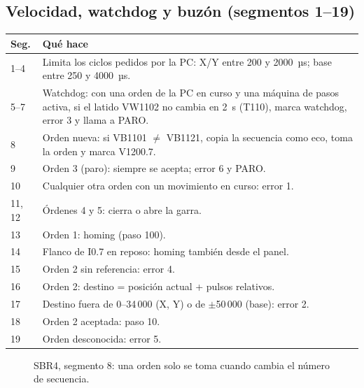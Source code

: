 \subsection{Velocidad, watchdog y buzón (segmentos 1--19)}
\begin{center}\small
\begin{longtable}{>{\raggedright}p{1.4cm} >{\raggedright\arraybackslash}p{13.6cm}}
\toprule
\textbf{Seg.} & \textbf{Qué hace}\\
\midrule
\endhead
1--4 & Limita los ciclos pedidos por la PC: X/Y entre 200 y 2000~µs; base entre 250 y 4000~µs.\\
5--7 & Watchdog: con una orden de la PC en curso y una máquina de pasos activa, si el latido VW1102 no cambia en 2~s (T110), marca watchdog, error 3 y llama a PARO.\\
8 & Orden nueva: si VB1101 $\neq$ VB1121, copia la secuencia como eco, toma la orden y marca V1200.7.\\
9 & Orden 3 (paro): siempre se acepta; error 6 y PARO.\\
10 & Cualquier otra orden con un movimiento en curso: error 1.\\
11, 12 & Órdenes 4 y 5: cierra o abre la garra.\\
13 & Orden 1: homing (paso 100).\\
14 & Flanco de I0.7 en reposo: homing también desde el panel.\\
15 & Orden 2 sin referencia: error 4.\\
16 & Orden 2: destino = posición actual + pulsos relativos.\\
17 & Destino fuera de 0--34\,000 (X, Y) o de $\pm$50\,000 (base): error 2.\\
18 & Orden 2 aceptada: paso 10.\\
19 & Orden desconocida: error 5.\\
\bottomrule
\end{longtable}
\end{center}

\begin{figure}[H]
\centering
{}
\caption{SBR4, segmento 8: una orden solo se toma cuando cambia el número de secuencia.}
\end{figure}


